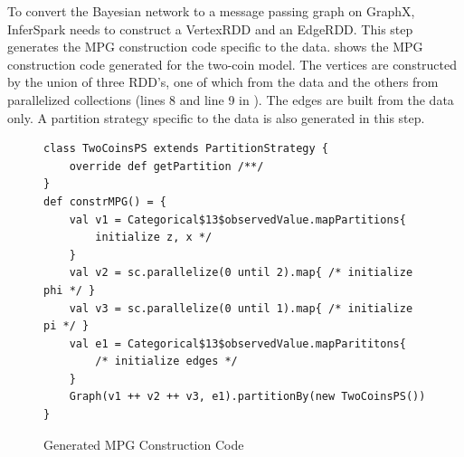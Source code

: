 To convert the Bayesian network to a message passing graph on GraphX,
InferSpark needs to construct a VertexRDD and an EdgeRDD. This step generates
the MPG construction code specific to the data.
 shows the MPG construction code
generated for the two-coin model. 
The vertices are constructed by the union
of three RDD's, one of which from the data and the others from 
parallelized collections (lines 8 and line 9 in ).
The edges are built from the data only. 
A partition strategy specific to the
data is also generated in this step.




\begin{figure}[h]
\begin{lstlisting}
class TwoCoinsPS extends PartitionStrategy {
	override def getPartition /**/
}
def constrMPG() = {
	val v1 = Categorical$13$observedValue.mapPartitions{
		initialize z, x */
	}
	val v2 = sc.parallelize(0 until 2).map{ /* initialize phi */ }
	val v3 = sc.parallelize(0 until 1).map{ /* initialize pi */ }
	val e1 = Categorical$13$observedValue.mapParititons{
		/* initialize edges */
	}
	Graph(v1 ++ v2 ++ v3, e1).partitionBy(new TwoCoinsPS())
}
\end{lstlisting}
\caption{Generated MPG Construction Code}
\label{fig:two_coins_mpg_constr_code}
\end{figure}


%

